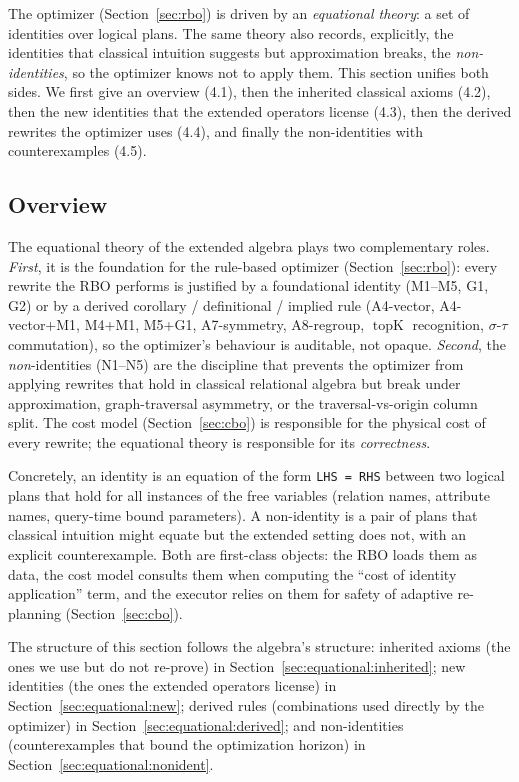 \documentclass[sigconf]{acmart}
\theoremstyle{plain}
\theoremstyle{definition}
\newcommand{\topK}{\operatorname{topK}}
\theoremstyle{remark}
\begin{document}
The optimizer (Section~\ref{sec:rbo}) is driven by an
\emph{equational theory}: a set of identities over logical plans.
The same theory also records, explicitly, the identities that
classical intuition suggests but approximation breaks, the
\emph{non-identities}, so the optimizer knows not to apply them.
This section unifies both sides. We first give an overview
(4.1), then the inherited classical axioms (4.2), then the new
identities that the extended operators license (4.3), then the
derived rewrites the optimizer uses (4.4), and finally the
non-identities with counterexamples (4.5).

\subsection{Overview}\label{sec:equational:overview}

The equational theory of the extended algebra plays two
complementary roles. \emph{First}, it is the foundation for the
rule-based optimizer (Section~\ref{sec:rbo}): every rewrite the
RBO performs is justified by a foundational identity (M1--M5, G1,
G2) or by a derived corollary / definitional / implied rule (A4-vector,
A4-vector+M1, M4+M1, M5+G1, A7-symmetry, A8-regroup, $\topK$
recognition, $\sigma$-$\tau$ commutation), so the optimizer's
behaviour is auditable, not opaque. \emph{Second}, the
\emph{non}-identities (N1--N5) are the discipline that prevents
the optimizer from applying rewrites that hold in classical
relational algebra but break under approximation, graph-traversal
asymmetry, or the traversal-vs-origin column split. The cost model
(Section~\ref{sec:cbo}) is responsible for the physical cost of
every rewrite; the equational theory is responsible for its
\emph{correctness}.

Concretely, an identity is an equation of the form
\texttt{LHS = RHS} between two logical plans that hold for all
instances of the free variables (relation names, attribute names,
query-time bound parameters). A non-identity is a pair of plans
that classical intuition might equate but the extended setting
does not, with an explicit counterexample. Both are first-class
objects: the RBO loads them as data, the cost model consults them
when computing the ``cost of identity application'' term, and the
executor relies on them for safety of adaptive re-planning
(Section~\ref{sec:cbo}).

The structure of this section follows the algebra's structure:
inherited axioms (the ones we use but do not re-prove) in
Section~\ref{sec:equational:inherited}; new identities (the ones
the extended operators license) in
Section~\ref{sec:equational:new}; derived rules (combinations used
directly by the optimizer) in
Section~\ref{sec:equational:derived}; and non-identities
(counterexamples that bound the optimization horizon) in
Section~\ref{sec:equational:nonident}.
\end{document}
